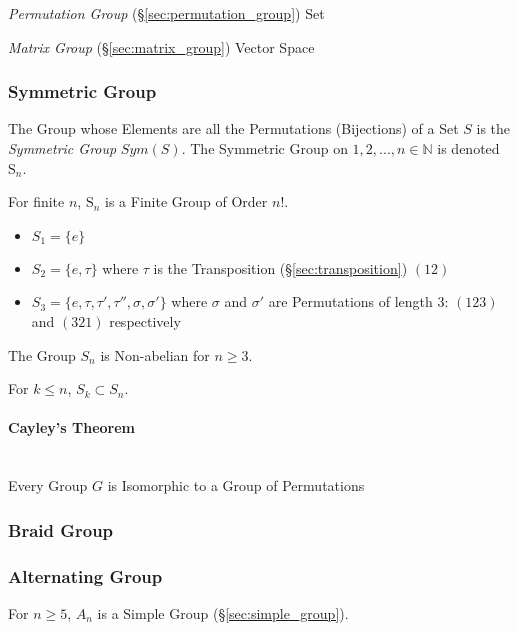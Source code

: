 \emph{Permutation Group} (\S\ref{sec:permutation_group}) Set

\emph{Matrix Group} (\S\ref{sec:matrix_group}) Vector Space



\subsubsection{Symmetric Group}\label{sec:symmetric_group}

The Group whose Elements are all the Permutations (Bijections) of a
Set $S$ is the \emph{Symmetric Group} $Sym(S)$. The Symmetric Group on
${1, 2, ..., n} \in \mathbb{N}$ is denoted $\mathrm{S}_n$.

For finite $n$, $\mathrm{S}_n$ is a Finite Group of Order $n!$.

\begin{itemize}
    \item $S_1 = \{e\}$
    \item $S_2 = \{e,\tau\}$ where $\tau$ is the Transposition
      (\S\ref{sec:transposition}) $(12)$
    \item $S_3 = \{e, \tau, \tau', \tau'', \sigma, \sigma'\}$ where
      $\sigma$ and $\sigma'$ are Permutations of length 3: $(123)$ and
      $(321)$ respectively
\end{itemize}
The Group $S_n$ is Non-abelian for $n \geq 3$.

For $k \leq n$, $S_k \subset S_n$.



\paragraph{Cayley's Theorem}\label{sec:cayleys_theorem}
\hfill \\

Every Group $G$ is Isomorphic to a Group of Permutations



\subsubsection{Braid Group}\label{sec:braid_group}



\subsubsection{Alternating Group}\label{sec:alternating_group}

For $n \geq 5$, $A_n$ is a Simple Group (\S\ref{sec:simple_group}).



